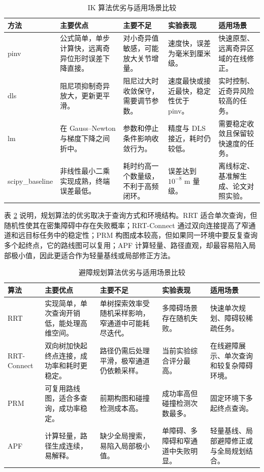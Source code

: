 \documentclass[UTF8,zihao=-4]{ctexart}
\begin{document}
\begin{table}[!htbp]
  \centering
  \caption{IK 算法优劣与适用场景比较}
  \label{tab:ik-tradeoffs}
  \small
  \begin{tabularx}{\textwidth}{p{2.4cm}p{3.0cm}p{3.2cm}p{2.8cm}X}
    \toprule
    方法 & 主要优点 & 主要不足 & 实验表现 & 适用场景 \\
    \midrule
    pinv & 公式简单，单步计算快，远离奇异位形时误差下降直接。 & 对小奇异值敏感，可能放大关节增量。 & 速度快，误差为毫米到厘米级。 & 快速原型、远离奇异区域的在线修正。 \\
    dls & 阻尼项抑制奇异放大，更新更平滑。 & 阻尼过大时收敛保守，需要调节参数。 & 速度最快或接近最快，稳定性优于 pinv。 & 实时控制、近奇异风险较高的任务。 \\
    lm & 在 Gauss--Newton 与梯度下降之间折中。 & 参数和停止条件影响收敛行为。 & 精度与 DLS 接近，耗时仍较低。 & 需要稳定收敛且保留较快速度的任务。 \\
    scipy\_baseline & 非线性最小二乘实现成熟，终端误差最低。 & 耗时约高一个数量级，不利于高频闭环。 & 误差达到 $10^{-8}$ m 量级。 & 离线标定、基准解生成、论文对照实验。 \\
    \bottomrule
  \end{tabularx}
\end{table}

表 \ref{tab:planner-tradeoffs} 说明，规划算法的优劣取决于查询方式和环境结构。RRT 适合单次查询，但随机性使其在密集障碍中存在失败概率；RRT-Connect 通过双向连接提高了窄通道和远目标任务中的稳定性；PRM 构图成本较高，但如果同一环境中要反复查询多个起终点，它的路线图可以复用；APF 计算轻量、路径直观，却最容易陷入局部极小值，因此更适合作为轻量基线或局部修正方法。

\begin{table}[!htbp]
  \centering
  \caption{避障规划算法优劣与适用场景比较}
  \label{tab:planner-tradeoffs}
  \small
  \begin{tabularx}{\textwidth}{p{2.3cm}p{3.0cm}p{3.2cm}p{2.8cm}X}
    \toprule
    算法 & 主要优点 & 主要不足 & 实验表现 & 适用场景 \\
    \midrule
    RRT & 实现简单，单次查询开销低，能处理高维空间。 & 单树探索效率受随机采样影响，窄通道中可能耗尽迭代。 & 多障碍场景存在随机失败。 & 快速单次规划、障碍较稀疏任务。 \\
    RRT-Connect & 双向树加快起终点连接，成功率和耗时更稳定。 & 路径仍需后处理平滑，极窄通道仍依赖采样。 & 当前实验综合评分最高。 & 在线避障展示、单次查询和较复杂障碍环境。 \\
    PRM & 可复用路线图，适合多查询，成功率稳定。 & 前期构图和碰撞检测成本高。 & 成功率高但碰撞检测次数最多。 & 固定环境下多起终点查询。 \\
    APF & 计算轻量，路径生成连续，易解释。 & 缺少全局搜索，易陷入局部极小值。 & 单障碍、多障碍和窄通道中失败明显。 & 轻量基线、局部避障修正或与全局规划结合。 \\
    \bottomrule
  \end{tabularx}
\end{table}
\end{document}
